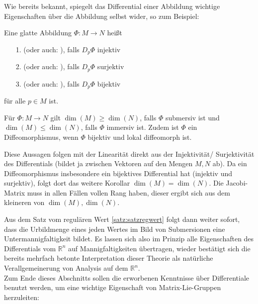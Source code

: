 \documentclass[../H_Analysis_main.tex]{subfiles}
\begin{document}
Wie bereits bekannt, spiegelt das Differential einer Abbildung wichtige Eigenschaften über die Abbildung selbst wider, so zum Beispiel:
\begin{defi}
Eine glatte Abbildung $\Phi: M \rightarrow N$ heißt 
\begin{itemize}
\item[1.]  (oder auch: ), falls $D_p \Phi$ injektiv

\item[2.]  (oder auch: ), falls $D_p \Phi$ surjektiv

\item[3.]  (oder auch: ), falls $D_p \Phi$ bijektiv
\end{itemize}
für alle $p \in M$ ist.
\end{defi}

\begin{cor}
Für $\Phi: M \rightarrow N$ gilt $\dim(M) \geq \dim(N)$, falls $\Phi$ submersiv ist und $\dim(M) \leq \dim(N)$, falls $\Phi$ immersiv ist. Zudem ist $\Phi$ ein Diffeomorphismus, wenn $\Phi$ bijektiv und lokal diffeomorph ist.
\end{cor}
Diese Aussagen folgen mit der Linearität direkt aus der Injektivität/ Surjektivität des Differentials (bildet ja zwischen Vektoren auf den Mengen $M, N$ ab). Da ein Diffeomorphismus insbesondere ein bijektives Differential hat (injektiv und surjektiv), folgt dort das weitere Korollar $\dim(M) = \dim(N)$. Die Jacobi-Matrix muss in allen Fällen vollen Rang haben, dieser ergibt sich aus dem kleineren von $\dim(M), \dim(N)$.


Aus dem Satz vom regulären Wert \ref{satz:satzregwert} folgt dann weiter sofort, dass die Urbildmenge eines jeden Wertes im Bild von Submersionen eine Untermannigfaltigkeit bildet. Es lassen sich also im Prinzip alle Eigenschaften des Differentials vom $\mathbb{R}^n$ auf Mannigfaltigkeiten übertragen, wieder bestätigt sich die bereits mehrfach betonte Interpretation dieser Theorie als natürliche Verallgemeinerung von Analysis auf dem $\mathbb{R}^n$.\\


Zum Ende dieses Abschnitts sollen die erworbenen Kenntnisse über Differentiale benutzt werden, um eine wichtige Eigenschaft von Matrix-Lie-Gruppen herzuleiten:
\end{document}
